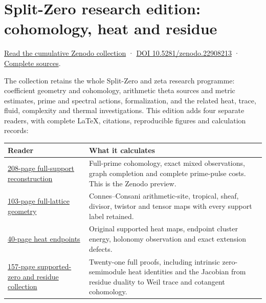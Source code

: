 \documentclass[
]{article}
\author{}
\date{}
\newcounter{none} %
\begin{document}
\section{Split-Zero research edition: cohomology, heat and
residue}\label{split-zero-research-edition-cohomology-heat-and-residue}

\href{https://zenodo.org/records/22908213}{Read the cumulative Zenodo
collection} · \href{https://doi.org/10.5281/zenodo.22908213}{DOI
10.5281/zenodo.22908213} ·
\href{https://zenodo.org/records/22908213/files/158-splitzero-cohomology-heat-residue-sources.zip?download=1}{Complete
sources}.

The collection retains the whole Split-Zero and zeta research programme:
coefficient geometry and cohomology, arithmetic theta sources and metric
estimates, prime and spectral actions, formalization, and the related
heat, trace, fluid, complexity and thermal investigations. This edition
adds four separate readers, with complete LaTeX, citations, reproducible
figures and calculation records:

{\def\LTcaptype{none} %
\begin{longtable}[]{@{}
  >{\raggedright\arraybackslash}p{}
  >{\raggedright\arraybackslash}p{}@{}}
\toprule\noalign{}
\begin{minipage}[b]{\linewidth}\raggedright
Reader
\end{minipage} & \begin{minipage}[b]{\linewidth}\raggedright
What it calculates
\end{minipage} \\
\midrule\noalign{}
\endhead
\bottomrule\noalign{}
\endlastfoot
\href{https://zenodo.org/records/22908213/files/154-splitzero-full-support-graph-pulses.pdf?download=1}{208-page
full-support reconstruction} & Full-prime cohomology, exact mixed
observations, graph completion and complete prime-pulse costs. This is
the Zenodo preview. \\
\href{https://zenodo.org/records/22908213/files/155-splitzero-full-lattice-cc.pdf?download=1}{103-page
full-lattice geometry} & Connes--Consani arithmetic-site, tropical,
sheaf, divisor, twistor and tensor maps with every support label
retained. \\
\href{https://zenodo.org/records/22908213/files/156-splitzero-heat-endpoints.pdf?download=1}{40-page
heat endpoints} & Original supported heat maps, endpoint cluster energy,
holonomy observation and exact extension defects. \\
\href{https://zenodo.org/records/22908213/files/157-splitzero-supported-residue-reader.pdf?download=1}{157-page
supported-zero and residue collection} & Twenty-one full proofs,
including intrinsic zero-semimodule heat identities and the Jacobian
from residue duality to Weil trace and cotangent cohomology. \\
\end{longtable}
}
\end{document}
